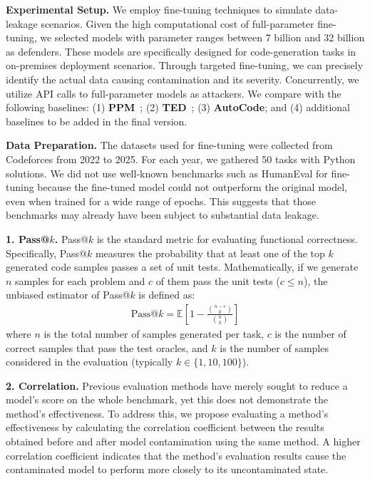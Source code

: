 \textbf{Experimental Setup.} We employ fine-tuning techniques to simulate data-leakage scenarios. Given the high computational cost of full-parameter fine-tuning, we selected models with parameter ranges between 7 billion and 32 billion as defenders. These models are specifically designed for code-generation tasks in on-premises deployment scenarios. Through targeted fine-tuning, we can precisely identify the actual data causing contamination and its severity. Concurrently, we utilize API calls to full-parameter models as attackers. We compare \tool{} with the following baselines: (1) \textbf{PPM}~\cite{chen2024ppm}; (2) \textbf{TED}~\cite{dong-etal-2024-generalization}; (3) \textbf{AutoCode}; and (4) additional baselines to be added in the final version.

\textbf{Data Preparation.} The datasets used for fine-tuning were collected from Codeforces from 2022 to 2025. For each year, we gathered 50 tasks with Python solutions. We did not use well-known benchmarks such as HumanEval for fine-tuning because the fine-tuned model could not outperform the original model, even when trained for a wide range of epochs. This suggests that those benchmarks may already have been subject to substantial data leakage.


\textbf{1. Pass@$k$.} Pass@$k$ is the standard metric for evaluating functional correctness. Specifically, Pass@$k$ measures the probability that at least one of the top $k$ generated code samples passes a set of unit tests. Mathematically, if we generate $n$ samples for each problem and $c$ of them pass the unit tests ($c \le n$), the unbiased estimator of Pass@$k$ is defined as:
\begin{align}
\text{Pass@}k = \mathbb{E} \left[ 1 - \frac{\binom{n-c}{k}}{\binom{n}{k}} \right]
\end{align}
where $n$ is the total number of samples generated per task, $c$ is the number of correct samples that pass the test oracles, and $k$ is the number of samples considered in the evaluation (typically $k \in \{1, 10, 100\}$).

\textbf{2. Correlation.} Previous evaluation methods have merely sought to reduce a model's score on the whole benchmark, yet this does not demonstrate the method's effectiveness. To address this, we propose evaluating a method's effectiveness by calculating the correlation coefficient between the results obtained before and after model contamination using the same method. A higher correlation coefficient indicates that the method's evaluation results cause the contaminated model to perform more closely to its uncontaminated state.

